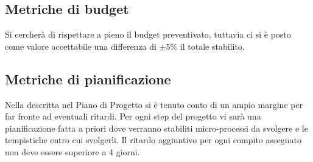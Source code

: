 \documentclass[../piano_di_qualifica.tex]{subfiles}
\begin{document}
\subsection{Metriche di budget}%
\label{sub:metr_bud}
Si cercherà di rispettare a pieno il budget preventivato, tuttavia ci si è posto come valore accettabile una differenza di ${\pm 5\%}$ il totale stabilito. 

\subsection{Metriche di pianificazione} %
\label{sub: metr_pianif}
Nella  descritta nel Piano di Progetto si è tenuto conto di un ampio margine per far fronte ad eventuali ritardi. Per ogni step del progetto vi sarà una pianificazione fatta a priori dove verranno stabiliti micro-processi da svolgere e le tempistiche entro cui svolgerli. Il ritardo aggiuntivo per ogni compito assegnato non deve essere superiore a 4 giorni. 

\end{document}
